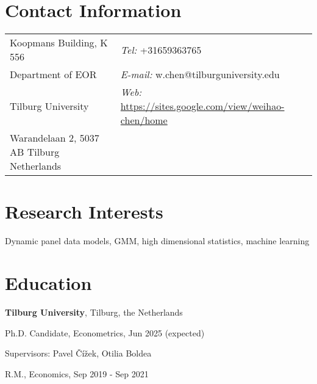\documentclass[margin,line]{res}
\newenvironment{list1}{
  \begin{list}{\ding{113}}{%
      \setlength{\itemsep}{0in}
      \setlength{\parsep}{0in} \setlength{\parskip}{0in}
      \setlength{\topsep}{0in} \setlength{\partopsep}{0in} 
      \setlength{\leftmargin}{0.17in}}}{\end{list}}
\begin{document}

\begin{resume}
\section{\sc Contact Information}
\vspace{.05in}
\begin{tabular}{@{}p{2in}p{4in}}
Koopmans Building, K 556     & {\it Tel:}  +31659363765 \\            
Department of EOR   &  {\it E-mail:}  w.chen@tilburguniversity.edu\\         
Tilburg University &{\it Web:} \url{https://sites.google.com/view/weihao-chen/home} \\       
Warandelaan 2, 5037 AB Tilburg Netherlands  & \\     
\end{tabular}

\section{\sc Research Interests}
Dynamic panel data models, GMM, high dimensional statistics, machine learning %

\section{\sc Education}
{\bf Tilburg University}, Tilburg, the Netherlands\\
\vspace*{-.1in}
\begin{list1}
\item[] Ph.D. Candidate, Econometrics, Jun 2025 (expected) 
\vspace*{.05in}
\item[] Supervisors:  Pavel \v{C}ížek, Otilia Boldea
%
%
\vspace*{.05in}
\item[] R.M., Economics,  Sep 2019 - Sep 2021
\end{list1}


\end{resume}
\end{document}
